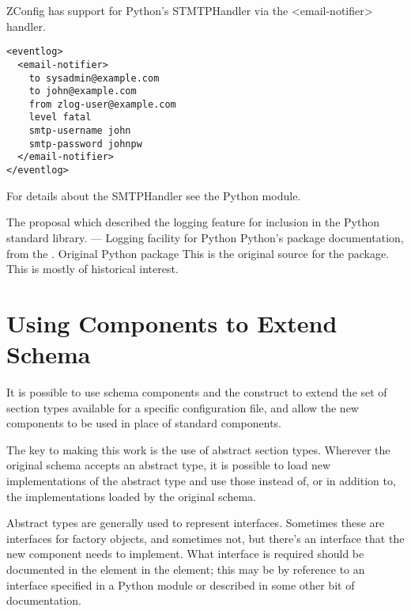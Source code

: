 \documentclass{howto}
\begin{document}
ZConfig has support for Python's STMTPHandler via the <email-notifier>
handler.

\begin{verbatim}
<eventlog>
  <email-notifier>
    to sysadmin@example.com
    to john@example.com
    from zlog-user@example.com
    level fatal
    smtp-username john
    smtp-password johnpw
  </email-notifier>
</eventlog>
\end{verbatim}
  
For details about the SMTPHandler see the Python  module.

\begin{seealso}
         {The proposal which described the logging feature for
          inclusion in the Python standard library.}
          { --- Logging facility for Python}
          {Python's  package documentation, from the
           .}
          {Original Python  package}
          {This is the original source for the 
           package.  This is mostly of historical interest.}
\end{seealso}


\section{Using Components to Extend Schema}


It is possible to use schema components and the 
construct to extend the set of section types available for a specific
configuration file, and allow the new components to be used in place
of standard components.

The key to making this work is the use of abstract section types.
Wherever the original schema accepts an abstract type, it is possible
to load new implementations of the abstract type and use those instead
of, or in addition to, the implementations loaded by the original
schema.

Abstract types are generally used to represent interfaces.  Sometimes
these are interfaces for factory objects, and sometimes not, but
there's an interface that the new component needs to implement.  What
interface is required should be documented in the
 element in the  element;
this may be by reference to an interface specified in a Python module
or described in some other bit of documentation.
\end{document}

